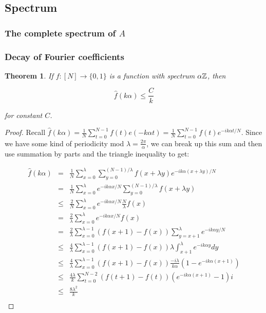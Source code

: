 \documentclass{article}
\newtheorem{theorem}{Theorem}[section]
\theoremstyle{definition}
\theoremstyle{remark}
\numberwithin{equation}{section}
\begin{document}
{\color{red}

\subsection{Spectrum}

\subsubsection{The complete spectrum of $A$}

\subsubsection{Decay of Fourier coefficients}

\begin{theorem}\label{thm:decay}
  If $f : [N] \to \{0,1\}$ is a function with spectrum $\alpha\mathbb{Z}$, then

  \[\widehat{f}(k\alpha) \leq \frac{C}{k}\]

  for constant $C$.  
\end{theorem}

\begin{proof}


Recall $\widehat{f}(k\alpha) =
\frac{1}{N}\displaystyle\sum_{t=0}^{N-1}f(t)e(-k\alpha t) =
\frac{1}{N}\displaystyle\sum_{t=0}^{N-1}f(t)e^{-i k\alpha t/N}$.
Since we have some kind of periodicity mod $\lambda = \frac{2\pi}{\alpha}$,
we can break up this sum and then use summation by parts and the
triangle inequality to get:

\begin{eqnarray*}
  \widehat{f}(k\alpha) &=& \frac{1}{N}\sum_{x=0}^{\lambda}\sum_{y=0}^{(N-1)/\lambda}f(x+\lambda y)e^{-i k\alpha (x+\lambda y)/N}\\
                       &=& \frac{1}{N}\sum_{x=0}^{\lambda} e^{-i k\alpha x/N} \sum_{y=0}^{(N-1)/\lambda}f(x+\lambda y)\\
                       &\leq& \frac{2}{N}\sum_{x=0}^{\lambda} e^{-i k\alpha x/N} \frac{N}{\lambda} f(x)\\
                       &=& \frac{2}{\lambda}\sum_{x=0}^{\lambda} e^{-i k\alpha x/N} f(x)\\
                       &=& \frac{2}{\lambda}\sum_{x=0}^{\lambda-1} (f(x+1)-f(x))\sum_{y=x+1}^\lambda e^{-i k\alpha y/N}\\
                       &\leq& \frac{4}{\lambda}\sum_{x=0}^{\lambda-1} (f(x+1)-f(x)) \lambda \int_{x+1}^\lambda e^{-i k\alpha y}dy\\
                       &\leq& \frac{4}{\lambda}\sum_{x=0}^{\lambda-1} (f(x+1)-f(x)) \frac{-i\lambda}{k\alpha}(1-e^{-i k\alpha (x+1)})\\
                       &\leq& \frac{4\lambda}{k}\sum_{t=0}^{N-2}(f(t+1)-f(t))(e^{-i k\alpha (x+1)}-1)i\\
                       &\leq& \frac{8\lambda^2}{k}\\
\end{eqnarray*}


\end{proof}}
\end{document}
